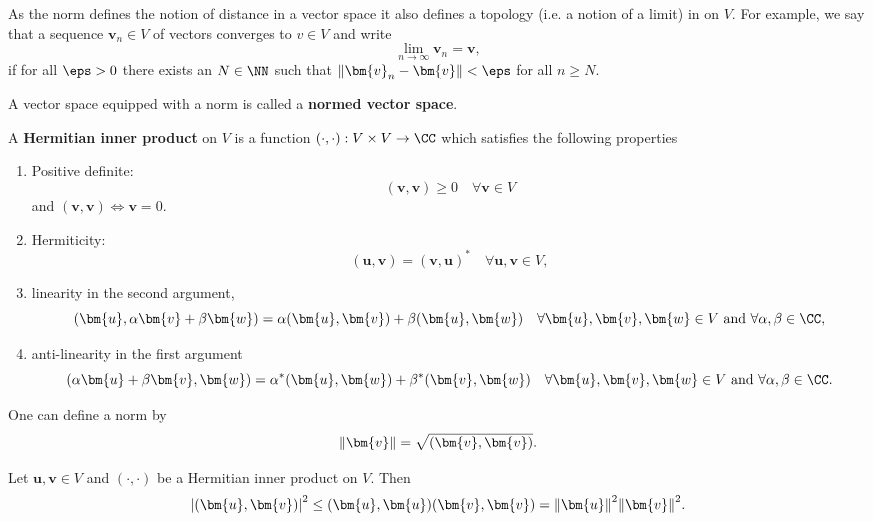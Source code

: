 \documentclass[12pt, a4paper]{article}
\begin{document}
\begin{mdremark}
    As the norm defines the notion of distance in a vector space it also defines a topology (i.e. a notion of a limit) in on \(V\). For example, we say that a sequence \(\bm{v}_n \in V\) of vectors converges to \(v \in V\) and write 
    \[\lim_{n \to \infty} \bm{v}_n =\bm{v},\]
    if for all \(\eps >0\) there exists an \(N \in \NN\) such that \(\norm{\bm{v}_n-\bm{v}}<\eps\) for all \(n \geq N\).
\end{mdremark}

\begin{definition}
    A vector space equipped with a norm is called a \textbf{normed vector space}.
\end{definition}

\begin{definition}
    A \textbf{Hermitian inner product} on \(V\) is a function \((\cdot, \cdot) : V \times V \to \CC\) which satisfies the following properties
    \begin{enumerate}
        \item Positive definite:
        \[(\bm{v},\bm{v}) \geq 0 \quad \forall \bm{v} \in V\]
        and \((\bm{v},\bm{v}) \iff \bm{v}=0\).
        \item Hermiticity:
        \[(\bm{u},\bm{v}) = (\bm{v},\bm{u})^* \quad \forall \bm{u},\bm{v} \in V,\]
        \item linearity in the second argument,
        \[(\bm{u},\alpha \bm{v} + \beta \bm{w}) = \alpha (\bm{u},\bm{v}) +\beta (\bm{u},\bm{w}) \quad \forall \bm{u},\bm{v},\bm{w} \in V \text{ and } \forall \alpha,\beta \in \CC,\]
        \item anti-linearity in the first argument 
        \[(\alpha \bm{u} +\beta \bm{v}, \bm{w}) = \alpha^* (\bm{u},\bm{w})+ \beta^*(\bm{v},\bm{w}) \quad \forall \bm{u},\bm{v},\bm{w} \in V \text{ and } \forall \alpha,\beta \in \CC.\]
    \end{enumerate}
\end{definition}

\begin{mdthm}
    One can define a norm by 
    \[\norm{\bm{v}} = \sqrt{(\bm{v},\bm{v})}.\]
\end{mdthm}

\begin{mdlemma}
    Let \(\bm{u},\bm{v} \in V\) and \((\cdot,\cdot)\) be a Hermitian inner product on \(V\). Then 
    \[\abs{(\bm{u},\bm{v})}^2 \leq (\bm{u},\bm{u})(\bm{v},\bm{v}) = \norm{\bm{u}}^2 \norm{\bm{v}}^2.\]
\end{mdlemma}
\end{document}
